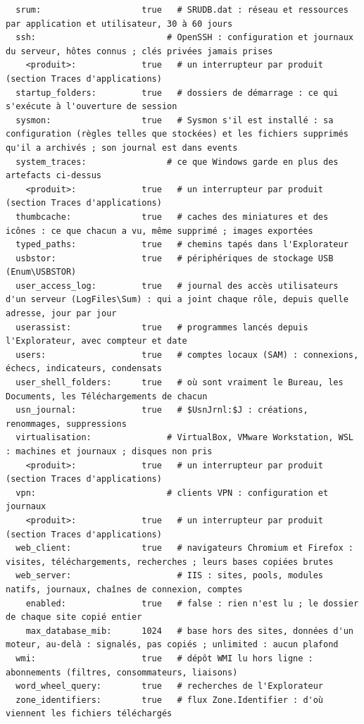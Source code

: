 \documentclass[11pt,a4paper,oneside]{report}
\begin{document}
\begin{lstlisting}
  srum:                    true   # SRUDB.dat : réseau et ressources par application et utilisateur, 30 à 60 jours
  ssh:                          # OpenSSH : configuration et journaux du serveur, hôtes connus ; clés privées jamais prises
    <produit>:             true   # un interrupteur par produit (section Traces d'applications)
  startup_folders:         true   # dossiers de démarrage : ce qui s'exécute à l'ouverture de session
  sysmon:                  true   # Sysmon s'il est installé : sa configuration (règles telles que stockées) et les fichiers supprimés qu'il a archivés ; son journal est dans events
  system_traces:                # ce que Windows garde en plus des artefacts ci-dessus
    <produit>:             true   # un interrupteur par produit (section Traces d'applications)
  thumbcache:              true   # caches des miniatures et des icônes : ce que chacun a vu, même supprimé ; images exportées
  typed_paths:             true   # chemins tapés dans l'Explorateur
  usbstor:                 true   # périphériques de stockage USB (Enum\USBSTOR)
  user_access_log:         true   # journal des accès utilisateurs d'un serveur (LogFiles\Sum) : qui a joint chaque rôle, depuis quelle adresse, jour par jour
  userassist:              true   # programmes lancés depuis l'Explorateur, avec compteur et date
  users:                   true   # comptes locaux (SAM) : connexions, échecs, indicateurs, condensats
  user_shell_folders:      true   # où sont vraiment le Bureau, les Documents, les Téléchargements de chacun
  usn_journal:             true   # $UsnJrnl:$J : créations, renommages, suppressions
  virtualisation:               # VirtualBox, VMware Workstation, WSL : machines et journaux ; disques non pris
    <produit>:             true   # un interrupteur par produit (section Traces d'applications)
  vpn:                          # clients VPN : configuration et journaux
    <produit>:             true   # un interrupteur par produit (section Traces d'applications)
  web_client:              true   # navigateurs Chromium et Firefox : visites, téléchargements, recherches ; leurs bases copiées brutes
  web_server:                     # IIS : sites, pools, modules natifs, journaux, chaînes de connexion, comptes
    enabled:               true   # false : rien n'est lu ; le dossier de chaque site copié entier
    max_database_mib:      1024   # base hors des sites, données d'un moteur, au-delà : signalés, pas copiés ; unlimited : aucun plafond
  wmi:                     true   # dépôt WMI lu hors ligne : abonnements (filtres, consommateurs, liaisons)
  word_wheel_query:        true   # recherches de l'Explorateur
  zone_identifiers:        true   # flux Zone.Identifier : d'où viennent les fichiers téléchargés
\end{lstlisting}
\end{document}
